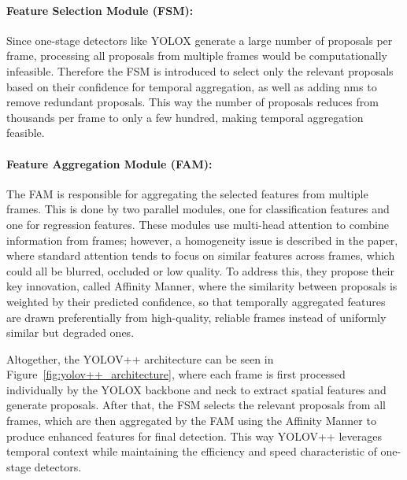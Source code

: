 \documentclass[final,twoside]{vutinfth}
\begin{document}
\paragraph{Feature Selection Module (FSM):}
Since one-stage detectors like YOLOX generate a large number of proposals per frame, processing all proposals from multiple frames would be computationally infeasible.
Therefore the FSM is introduced to select only the relevant proposals based on their confidence for temporal aggregation, as well as adding \gls{nms} to remove redundant proposals.
This way the number of proposals reduces from thousands per frame to only a few hundred, making temporal aggregation feasible.

\paragraph{Feature Aggregation Module (FAM):}
The FAM is responsible for aggregating the selected features from multiple frames. This is done by two parallel modules, one for classification features and one for regression features.
These modules use multi-head attention to combine information from frames; however, a homogeneity issue is described in the paper, where standard attention tends to focus on similar features across frames, which could all be blurred, occluded or low quality.
To address this, they propose their key innovation, called Affinity Manner, where the similarity between proposals is weighted by their predicted confidence, so that temporally aggregated features are drawn preferentially from high-quality, reliable frames instead of uniformly similar but degraded ones.

Altogether, the YOLOV++ architecture can be seen in Figure~\ref{fig:yolov++_architecture}, where each frame is first processed individually by the YOLOX backbone and neck to extract spatial features and generate proposals.
After that, the FSM selects the relevant proposals from all frames, which are then aggregated by the FAM using the Affinity Manner to produce enhanced features for final detection.
This way YOLOV++ leverages temporal context while maintaining the efficiency and speed characteristic of one-stage detectors.
\end{document}
